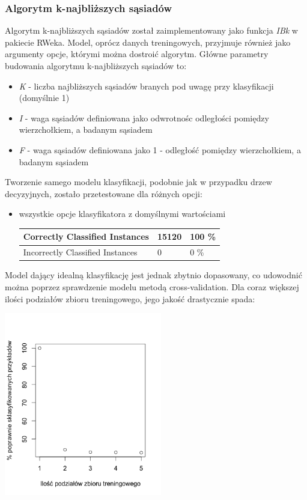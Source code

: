 \documentclass[11pt]{article} %
\begin{document}
\subsubsection{Algorytm k-najbliższych sąsiadów}

Algorytm k-najbliższych sąsiadów został zaimplementowany jako funkcja \emph{IBk}  w pakiecie RWeka. Model, oprócz danych treningowych, przyjmuje również jako argumenty opcje, którymi można dostroić algorytm. Główne parametry budowania algorytmu k-najbliższych sąsiadów to:
\begin{itemize}
\item \emph{K} - liczba najbliższych sąsiadów branych pod uwagę przy klasyfikacji (domyślnie 1)
\item \emph{I} - waga sąsiadów definiowana jako odwrotnośc odległości pomiędzy wierzchołkiem, a badanym sąsiadem
\item \emph{F} - waga sąsiadów definiowana jako 1 - odległość pomiędzy wierzchołkiem, a badanym sąsiadem
\end{itemize}

Tworzenie samego modelu klasyfikacji, podobnie jak w przypadku drzew decyzyjnych, zostało przetestowane dla różnych opcji:
\begin{itemize}
\item wszystkie opcje klasyfikatora z domyślnymi wartościami

\begin{center}
    \begin{tabular}{ | l | l | l | }
    \hline
    	Correctly Classified Instances & 15120 & 100 \% \\ \hline
	Incorrectly Classified Instances & 0 & 0 \% \\ \hline
    \end{tabular}
\end{center}
\end{itemize}

Model dający idealną klasyfikację jest jednak zbytnio dopasowany, co udowodnić można poprzez sprawdzenie modelu metodą cross-validation. Dla coraz większej ilości podziałów zbioru treningowego, jego jakość drastycznie spada:

\begin{center}
	\includegraphics[height=8cm]{knn-cross-validation}
\end{center}
\end{document}
